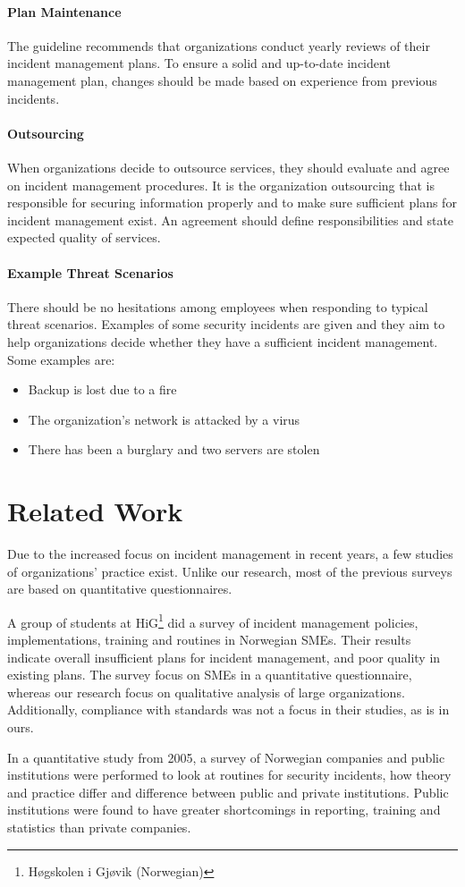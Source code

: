 \paragraph{Plan Maintenance}
The guideline recommends that organizations conduct yearly reviews of their incident management plans. To ensure a solid and up-to-date incident management plan, changes should be made based on experience from previous incidents. 

\paragraph{Outsourcing}
When organizations decide to outsource services, they should evaluate and agree on incident management procedures. It is the organization outsourcing that is responsible for securing information properly and to make sure sufficient plans for incident management exist. An agreement should define responsibilities and state expected quality of services. 

\paragraph{Example Threat Scenarios}
There should be no hesitations among employees when responding to typical threat scenarios. Examples of some security incidents are given and they aim to help organizations decide whether they have a sufficient incident management. Some examples are:
\begin{itemize}
\item Backup is lost due to a fire
\item The organization's network is attacked by a virus
\item There has been a burglary and two servers are stolen 
\end{itemize}



\section{Related Work}
Due to the increased focus on incident management in recent years, a few studies of organizations' practice exist. Unlike our research, most of the previous surveys are based on quantitative questionnaires.

A group of students at HiG\footnote{H\o gskolen i Gj\o vik (Norwegian)} did a survey of incident management policies, implementations, training and routines in Norwegian \acp{SME}. Their results indicate overall insufficient plans for incident management, and poor quality in existing plans. The survey focus on \acp{SME}  in a quantitative questionnaire, whereas our research focus on qualitative analysis of large organizations. Additionally, compliance with standards was not a focus in their studies, as is in ours.

In a quantitative study from 2005\cite{brage}, a survey of Norwegian companies and public institutions were performed to look at routines for security incidents, how theory and practice differ and difference between public and private institutions. Public institutions were found to have greater shortcomings in reporting, training and statistics than private companies. 
